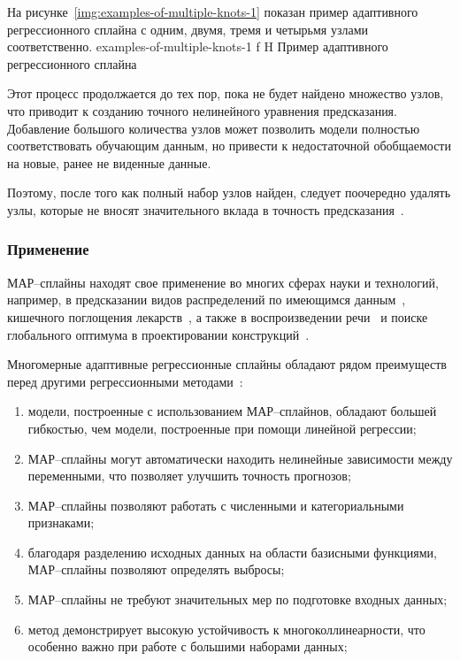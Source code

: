 На рисунке~\ref{img:examples-of-multiple-knots-1} показан пример адаптивного регрессионного сплайна с одним, двумя, тремя и четырьмя узлами соответственно.
{examples-of-multiple-knots-1}
{f}
{H}
{\textwidth}
{Пример адаптивного регрессионного сплайна}

Этот процесс продолжается до тех пор, пока не будет найдено множество узлов, что приводит к созданию точного нелинейного уравнения предсказания.
Добавление большого количества узлов может позволить модели полностью соответствовать обучающим данным, но привести к недостаточной обобщаемости на новые, ранее не виденные данные.

Поэтому, после того как полный набор узлов найден, следует поочередно удалять узлы, которые не вносят значительного вклада в точность предсказания~\cite{gitbook}.

\subsubsection*{Применение}

МАР--сплайны находят свое применение во многих сферах науки и технологий, например, в предсказании видов распределений по имеющимся данным~\cite{elith2007}, кишечного поглощения лекарств~\cite{deconinck2007}, а также в воспроизведении речи~\cite{haas1998} и поиске глобального оптимума в проектировании конструкций~\cite{crino2007}.

Многомерные адаптивные регрессионные сплайны обладают рядом преимуществ перед другими регрессионными методами~\cite{fedosin}:
\begin{enumerate}[label=\arabic*), leftmargin=1.6\parindent]
    \item модели, построенные с использованием МАР--сплайнов, обладают большей гибкостью, чем модели, построенные при помощи линейной регрессии;
    \item МАР--сплайны могут автоматически находить нелинейные зависимости между переменными, что позволяет улучшить точность прогнозов;
    \item МАР--сплайны позволяют работать с численными и категориальными признаками;
    \item благодаря разделению исходных данных на области базисными функциями, МАР--сплайны позволяют определять выбросы;
    \item МАР--сплайны не требуют значительных мер по подготовке входных данных;
    \item метод демонстрирует высокую устойчивость к многоколлинеарности, что особенно важно при работе с большими наборами данных;
\end{enumerate}

